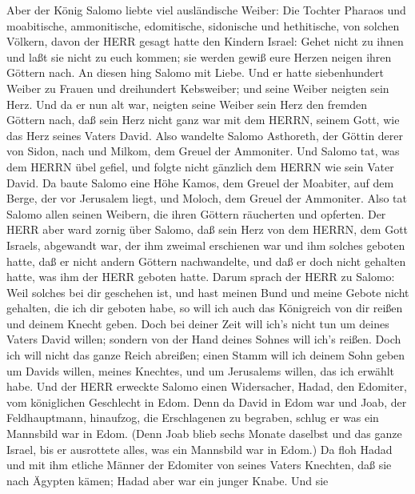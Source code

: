  Aber der König Salomo liebte viel ausländische Weiber: Die
Tochter Pharaos und moabitische, ammonitische, edomitische, sidonische
und hethitische,  von solchen Völkern, davon der HERR gesagt
hatte den Kindern Israel: Gehet nicht zu ihnen und laßt sie nicht zu
euch kommen; sie werden gewiß eure Herzen neigen ihren Göttern nach. An
diesen hing Salomo mit Liebe.  Und er hatte siebenhundert
Weiber zu Frauen und dreihundert Kebsweiber; und seine Weiber neigten
sein Herz.  Und da er nun alt war, neigten seine Weiber sein
Herz den fremden Göttern nach, daß sein Herz nicht ganz war mit dem
HERRN, seinem Gott, wie das Herz seines Vaters David.  Also
wandelte Salomo Asthoreth, der Göttin derer von Sidon, nach und Milkom,
dem Greuel der Ammoniter.  Und Salomo tat, was dem HERRN
übel gefiel, und folgte nicht gänzlich dem HERRN wie sein Vater David.
 Da baute Salomo eine Höhe Kamos, dem Greuel der Moabiter,
auf dem Berge, der vor Jerusalem liegt, und Moloch, dem Greuel der
Ammoniter.  Also tat Salomo allen seinen Weibern, die ihren
Göttern räucherten und opferten.  Der HERR aber ward zornig
über Salomo, daß sein Herz von dem HERRN, dem Gott Israels, abgewandt
war, der ihm zweimal erschienen war  und ihm solches
geboten hatte, daß er nicht andern Göttern nachwandelte, und daß er doch
nicht gehalten hatte, was ihm der HERR geboten hatte. 
Darum sprach der HERR zu Salomo: Weil solches bei dir geschehen ist, und
hast meinen Bund und meine Gebote nicht gehalten, die ich dir geboten
habe, so will ich auch das Königreich von dir reißen und deinem Knecht
geben.  Doch bei deiner Zeit will ich's nicht tun um deines
Vaters David willen; sondern von der Hand deines Sohnes will ich's
reißen.  Doch ich will nicht das ganze Reich abreißen;
einen Stamm will ich deinem Sohn geben um Davids willen, meines
Knechtes, und um Jerusalems willen, das ich erwählt habe. 
Und der HERR erweckte Salomo einen Widersacher, Hadad, den Edomiter, vom
königlichen Geschlecht in Edom.  Denn da David in Edom war
und Joab, der Feldhauptmann, hinaufzog, die Erschlagenen zu begraben,
schlug er was ein Mannsbild war in Edom.  (Denn Joab blieb
sechs Monate daselbst und das ganze Israel, bis er ausrottete alles, was
ein Mannsbild war in Edom.)  Da floh Hadad und mit ihm
etliche Männer der Edomiter von seines Vaters Knechten, daß sie nach
Ägypten kämen; Hadad aber war ein junger Knabe.  Und sie
